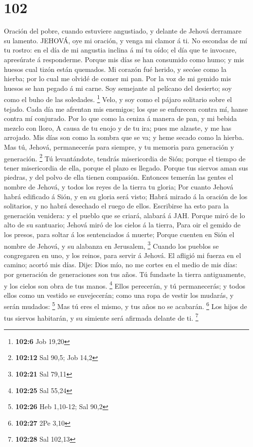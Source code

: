 \hypertarget{section-101}{%
\section{102}\label{section-101}}

 Oración del pobre, cuando estuviere angustiado, y delante
de Jehová derramare su lamento. JEHOVÁ, oye mi oración, y venga mi
clamor á ti.  No escondas de mí tu rostro: en el día de mi
angustia inclina á mí tu oído; el día que te invocare, apresúrate á
responderme.  Porque mis días se han consumido como humo; y
mis huesos cual tizón están quemados.  Mi corazón fué
herido, y secóse como la hierba; por lo cual me olvidé de comer mi pan.
 Por la voz de mi gemido mis huesos se han pegado á mi
carne.  Soy semejante al pelícano del desierto; soy como el
buho de las soledades. \footnote{\textbf{102:6} Job 19,20} 
Velo, y soy como el pájaro solitario sobre el tejado.  Cada
día me afrentan mis enemigos; los que se enfurecen contra mí, hanse
contra mí conjurado.  Por lo que como la ceniza á manera de
pan, y mi bebida mezclo con lloro,  A causa de tu enojo y
de tu ira; pues me alzaste, y me has arrojado.  Mis días
son como la sombra que se va; y heme secado como la hierba.
 Mas tú, Jehová, permanecerás para siempre, y tu memoria
para generación y generación. \footnote{\textbf{102:12} Sal 90,5; Job
  14,2}  Tú levantándote, tendrás misericordia de Sión;
porque el tiempo de tener misericordia de ella, porque el plazo es
llegado.  Porque tus siervos aman sus piedras, y del polvo
de ella tienen compasión.  Entonces temerán las gentes el
nombre de Jehová, y todos los reyes de la tierra tu gloria;
 Por cuanto Jehová habrá edificado á Sión, y en su gloria
será visto;  Habrá mirado á la oración de los solitarios, y
no habrá desechado el ruego de ellos.  Escribirse ha esto
para la generación venidera: y el pueblo que se criará, alabará á JAH.
 Porque miró de lo alto de su santuario; Jehová miró de los
cielos á la tierra,  Para oir el gemido de los presos, para
soltar á los sentenciados á muerte;  Porque cuenten en Sión
el nombre de Jehová, y su alabanza en Jerusalem, \footnote{\textbf{102:21}
  Sal 79,11}  Cuando los pueblos se congregaren en uno, y
los reinos, para servir á Jehová.  El afligió mi fuerza en
el camino; acortó mis días.  Dije: Dios mío, no me cortes
en el medio de mis días: por generación de generaciones son tus años.
 Tú fundaste la tierra antiguamente, y los cielos son obra
de tus manos. \footnote{\textbf{102:25} Sal 55,24}  Ellos
perecerán, y tú permanecerás; y todos ellos como un vestido se
envejecerán; como una ropa de vestir los mudarás, y serán mudados:
\footnote{\textbf{102:26} Heb 1,10-12; Sal 90,2}  Mas tú
eres el mismo, y tus años no se acabarán. \footnote{\textbf{102:27} 2Pe
  3,10}  Los hijos de tus siervos habitarán, y su simiente
será afirmada delante de ti. \footnote{\textbf{102:28} Sal 102,13}

